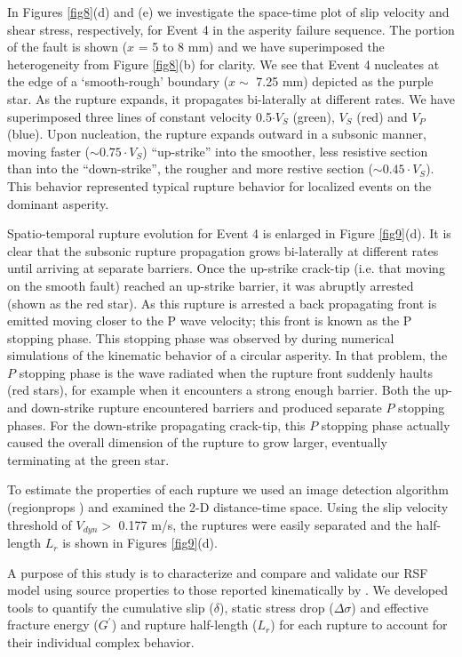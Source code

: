 \documentclass[preprint,1p, 10pt,authoryear]{elsarticle}
\begin{document}
In Figures \ref{fig8}(d) and (e) we investigate the space-time plot of slip velocity and shear stress, respectively, for Event 4 in the asperity failure sequence. The portion of the fault is shown ($x$ = 5 to 8 mm) and we have superimposed the heterogeneity from Figure \ref{fig8}(b) for clarity. We see that Event 4 nucleates at the edge of a `smooth-rough' boundary ($x \sim$ 7.25 mm) depicted as the purple star. As the rupture expands, it propagates bi-laterally at different rates. We have superimposed three lines of constant velocity 0.5$\cdot V_{S}$ (green), $V_{S}$ (red) and $V_{P}$ (blue).  Upon nucleation, the rupture expands outward in a subsonic manner, moving faster ($\sim 0.75 \cdot V_{S}$) ``up-strike'' into the smoother, less resistive section than into the ``down-strike'', the rougher and more restive section ($\sim 0.45\cdot V_{S}$). This behavior represented typical rupture behavior for localized events on the dominant asperity.

Spatio-temporal rupture evolution for Event 4 is enlarged in Figure \ref{fig9}(d).  It is clear that the subsonic rupture propagation grows bi-laterally at different rates until arriving at separate barriers. Once the up-strike crack-tip (i.e. that moving on the smooth fault) reached an up-strike barrier, it was abruptly arrested (shown as the red star).  As this rupture is arrested a back propagating front is emitted moving closer to the P wave velocity; this front is known as the P stopping phase. This stopping phase was observed by \citet{Madariaga1976} during numerical simulations of the kinematic behavior of a circular asperity.  In that problem, the $P$ stopping phase is the wave radiated when the rupture front suddenly haults (red stars), for example when it encounters a strong enough barrier.  Both the up- and down-strike rupture encountered barriers and produced separate $P$ stopping phases.  For the down-strike propagating crack-tip, this $P$ stopping phase actually caused the overall dimension of the rupture to grow larger, eventually terminating at the green star. 

To estimate the properties of each rupture we used an image detection algorithm (regionprops \citep{Matlab}) and examined the 2-D distance-time space. Using the slip velocity threshold of $V_{dyn}>$ 0.177 m/s, the ruptures were easily separated and the half-length $L_{r}$ is shown in Figures \ref{fig9}(d).

A purpose of this study is to characterize and compare and validate our RSF model using source properties to those reported kinematically by \citet{Selvadurai2019}. We developed tools to quantify the cumulative slip ($\delta$), static stress drop ($\Delta \sigma$) and effective fracture energy ($G^{'}$) and rupture half-length ($L_{r}$) for each rupture to account for their individual complex behavior.
\end{document}
